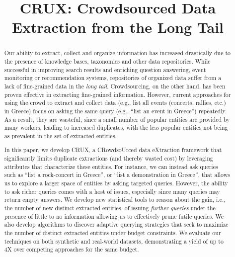 \documentclass{sig-alternate}
\newif\ifpaper
\begin{document}

\title{CRUX: Crowdsourced Data Extraction from the Long Tail}


\maketitle

\begin{abstract}
Our ability to extract, collect and organize information has increased drastically due to the presence of knowledge bases, taxonomies and other data repositories. While successful in improving search results and enriching question answering, event monitoring or recommendation systems, repositories of organized data suffer from a lack of fine-grained data in the {\em long tail}. Crowdsourcing, on the other hand, has been proven effective in extracting fine-grained information. However, current approaches for using the crowd to extract and collect data (e.g., list all events (concerts, rallies, etc.) in Greece) focus on asking the same query (e.g., ``list an event in Greece'') repeatedly. As a result, they are wasteful, since a small number of popular entities are provided by many workers, leading to increased duplicates, with the less popular entities not being as prevalent in the set of extracted entities.  

In this paper, we develop CRUX, a CRowdsoUrced data eXtraction framework that significantly limits duplicate extractions (and thereby wasted cost) by leveraging attributes that characterize these entities. For instance, we can instead ask queries such as ``list a rock-concert in Greece'', or ``list a demonstration in Greece'', that allows us to explore a larger space of entities by asking targeted queries. However, the ability to ask richer queries comes with a host of issues, especially since many queries may return empty answers.  We develop new statistical tools to reason about the gain, i.e., the number of new distinct extracted entities, of issuing {\em further queries} under the presence of little to no information allowing us to effectively prune futile queries. We also develop algorithms to discover adaptive querying strategies that seek to maximize the number of distinct extracted entities under budget constraints. We evaluate our techniques on both synthetic and real-world datasets, demonstrating a yield of up to 4X over competing approaches for the same budget.
\end{abstract}








\balance



\end{document}
